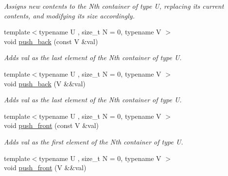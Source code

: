 \begin{DoxyCompactItemize}
\begin{DoxyCompactList}\small\item\em Assigns new contents to the Nth container of type U, replacing its current contents, and modifying its size accordingly. \end{DoxyCompactList}\item 
\hypertarget{classheterogeneous_1_1heterodeque_3_01_t_00_01_types_8_8_8_4_a5e30d725cbc664a325627b00bd241d76}{}{\footnotesize template$<$typename U , size\+\_\+t N = 0, typename V $>$ }\\void \hyperlink{classheterogeneous_1_1heterodeque_3_01_t_00_01_types_8_8_8_4_a5e30d725cbc664a325627b00bd241d76}{push\+\_\+back} (const V \&val)\label{classheterogeneous_1_1heterodeque_3_01_t_00_01_types_8_8_8_4_a5e30d725cbc664a325627b00bd241d76}

\begin{DoxyCompactList}\small\item\em Adds val as the last element of the Nth container of type U. \end{DoxyCompactList}\item 
\hypertarget{classheterogeneous_1_1heterodeque_3_01_t_00_01_types_8_8_8_4_a9f9813935b080444dd93c571f32859eb}{}{\footnotesize template$<$typename U , size\+\_\+t N = 0, typename V $>$ }\\void \hyperlink{classheterogeneous_1_1heterodeque_3_01_t_00_01_types_8_8_8_4_a9f9813935b080444dd93c571f32859eb}{push\+\_\+back} (V \&\&val)\label{classheterogeneous_1_1heterodeque_3_01_t_00_01_types_8_8_8_4_a9f9813935b080444dd93c571f32859eb}

\begin{DoxyCompactList}\small\item\em Adds val as the last element of the Nth container of type U. \end{DoxyCompactList}\item 
\hypertarget{classheterogeneous_1_1heterodeque_3_01_t_00_01_types_8_8_8_4_a3525f25cb699dd6cadbc48283a9b69ac}{}{\footnotesize template$<$typename U , size\+\_\+t N = 0, typename V $>$ }\\void \hyperlink{classheterogeneous_1_1heterodeque_3_01_t_00_01_types_8_8_8_4_a3525f25cb699dd6cadbc48283a9b69ac}{push\+\_\+front} (const V \&val)\label{classheterogeneous_1_1heterodeque_3_01_t_00_01_types_8_8_8_4_a3525f25cb699dd6cadbc48283a9b69ac}

\begin{DoxyCompactList}\small\item\em Adds val as the first element of the Nth container of type U. \end{DoxyCompactList}\item 
\hypertarget{classheterogeneous_1_1heterodeque_3_01_t_00_01_types_8_8_8_4_a9ead0fc2f577a56fe742a7421cf2cfb4}{}{\footnotesize template$<$typename U , size\+\_\+t N = 0, typename V $>$ }\\void \hyperlink{classheterogeneous_1_1heterodeque_3_01_t_00_01_types_8_8_8_4_a9ead0fc2f577a56fe742a7421cf2cfb4}{push\+\_\+front} (V \&\&val)\label{classheterogeneous_1_1heterodeque_3_01_t_00_01_types_8_8_8_4_a9ead0fc2f577a56fe742a7421cf2cfb4}


\end{DoxyCompactItemize}
